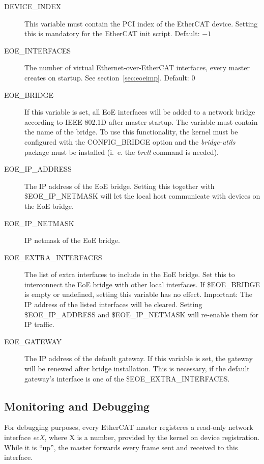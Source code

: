 \documentclass[a4paper,12pt,BCOR6mm,bibtotoc,idxtotoc]{scrbook}
\begin{document}
\begin{description}
\item[DEVICE\_INDEX] This variable must contain the PCI index of the
  EtherCAT device.  Setting this is mandatory for the EtherCAT init
  script. Default: $-1$
\item[EOE\_INTERFACES] The number of virtual Ethernet-over-EtherCAT
  interfaces, every master creates on startup. See
  section~\ref{sec:eoeimp}. Default: $0$
\item[EOE\_BRIDGE] If this variable is set, all EoE interfaces will be
  added to a network bridge according to IEEE 802.1D after master
  startup. The variable must contain the name of the bridge. To use
  this functionality, the kernel must be configured with the
  CONFIG\_BRIDGE option and the \textit{bridge-utils} package must be
  installed (i.~e. the \textit{brctl} command is needed).
\item[EOE\_IP\_ADDRESS] The IP address of the EoE bridge. Setting this
  together with \$EOE\_IP\_NETMASK will let the local host communicate
  with devices on the EoE bridge.
\item[EOE\_IP\_NETMASK] IP netmask of the EoE bridge.
\item[EOE\_EXTRA\_INTERFACES] The list of extra interfaces to include
  in the EoE brid\-ge. Set this to interconnect the EoE bridge with
  other local interfaces. If \$EOE\_\-BRIDGE is empty or undefined,
  setting this variable has no effect. Important: The IP address of
  the listed interfaces will be cleared. Setting
  \$EOE\_\-IP\_\-ADDRESS and \$EOE\_IP\_NETMASK will re-enable them
  for IP traffic.
\item[EOE\_GATEWAY] The IP address of the default gateway. If this
  variable is set, the gateway will be renewed after bridge
  installation. This is necessary, if the default gateway's interface
  is one of the \$EOE\_EXTRA\_INTERFACES.
\end{description}


\subsection{Monitoring and Debugging}
\label{sec:debug}

For debugging purposes, every EtherCAT master registeres a read-only
network interface \textit{ecX}, where X is a number, provided by the
kernel on device registration. While it is ``up'', the master forwards
every frame sent and received to this interface.
\end{document}
